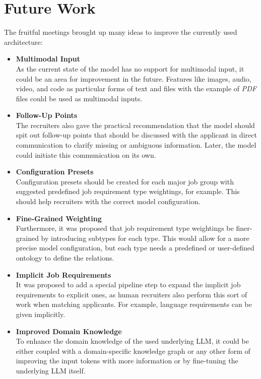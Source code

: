 \documentclass[draft,final]{thesisclass} %
\begin{document}
\section{Future Work} \label{future_work}
The fruitful meetings brought up many ideas to improve the currently used architecture:
\begin{itemize}
    \item \textbf{Multimodal Input}\\
    As the current state of the model has no support for multimodal input, it could be an area for improvement in the future. Features like images, audio, video, and code as particular forms of text and files with the example of \textit{PDF} files could be used as multimodal inputs.
    \item \textbf{Follow-Up Points}\\
    The recruiters also gave the practical recommendation that the model should spit out follow-up points that should be discussed with the applicant in direct communication to clarify missing or ambiguous information. Later, the model could initiate this communication on its own.
    \item \textbf{Configuration Presets}\\
    Configuration presets should be created for each major job group with suggested predefined job requirement type weightings, for example. This should help recruiters with the correct model configuration.
    \item \textbf{Fine-Grained Weighting}\\
    Furthermore, it was proposed that job requirement type weightings be finer-grained by introducing subtypes for each type. This would allow for a more precise model configuration, but each type needs a predefined or user-defined ontology to define the relations.
    \item \textbf{Implicit Job Requirements}\\
    It was proposed to add a special pipeline step to expand the implicit job requirements to explicit ones, as human recruiters also perform this sort of work when matching applicants. For example, language requirements can be given implicitly.
    \item \textbf{Improved Domain Knowledge}\\
    To enhance the domain knowledge of the used underlying \gls{LLM}, it could be either coupled with a domain-specific knowledge graph or any other form of improving the input tokens with more information or by fine-tuning the underlying \gls{LLM} itself.

\end{itemize}
\end{document}
